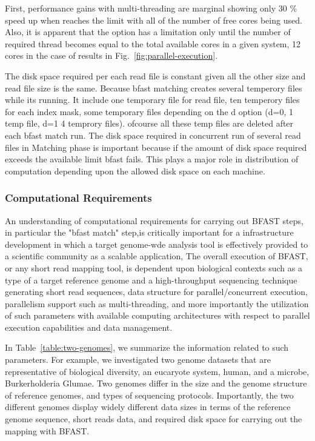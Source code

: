 \documentclass{acm_proc_article-sp}
\begin{document}
First, performance gains with multi-threading are marginal showing only 30 \% speed up when reaches the limit with all of the number of free cores being used.  Also, it is apparent that the option has a limitation only until the number of required thread becomes equal to the total available cores in a given system, 12 cores in the case of results in Fig.~\ref{fig:parallel-execution}.

The disk space required per each read file is constant given all the other size and read file size is the same. Because bfast matching creates several temperory files while its running. It include one temporary file for read file, ten temperory files for each index mask, some temporary files depending on the d option (d=0, 1 temp file, d=1 4 temprory files). ofcourse all these temp files are deleted after each bfast match run. The disk space required in concurrent run of several read files in Matching phase is important because if the amount of disk space required exceeds the available limit bfast fails. This plays a major role in distribution of computation depending upon the allowed disk space on each machine. 

\subsubsection{Computational Requirements}

An understanding of computational requirements for carrying out BFAST steps, in particular the "bfast match" step,is critically important for a infrastructure development in which a target genome-wde analysis tool is effectively provided to a scientific community as a scalable application,   The overall execution of BFAST, or any short read mapping tool, is dependent upon biological contexts such as a type of a target reference genome and a high-throughput sequencing technique generating short read sequences, data structure for parallel/concurrent execution, parallelism support such as multi-threading, and more importantly the utilization of such parameters with available computing architectures with respect to parallel execution capabilities and data management.  

In Table~\ref{table:two-genomes}, we summarize the information related to such parameters. For example, we investigated two genome datasets that are representative of biological diversity, an eucaryote system, human, and a microbe, Burkerholderia Glumae\cite{kim2011}.  Two genomes differ in the size and the genome structure of reference genomes, and types of sequencing protocols.  Importantly, the two different genomes display widely different data sizes in terms of the reference genome sequence, short reads data, and required disk space for carrying out the mapping with BFAST. 
\end{document}

